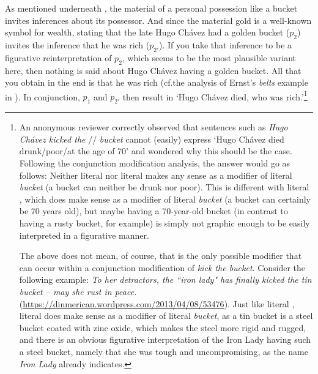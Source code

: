 \documentclass[output=paper]{langsci/langscibook}
\begin{document}
\noindent As mentioned underneath , the material of a personal possession like a bucket invites inferences about its possessor. And since the material gold is a well-known symbol for wealth, stating that the late Hugo Ch\'avez had a golden bucket ($p_{2}$) invites the inference that he was rich ($p_{2'}$). If you take that inference to be a figurative reinterpretation of $p_{2}$, which seems to be the most plausible variant here, then nothing is said about Hugo Ch\'avez having a golden bucket. All that you obtain in the end is that he was rich (cf.\@ the analysis of Ernst's \underline{} \textit{belts} example in ). In conjunction, $p_{1}$ and $p_{2'}$ then result in `Hugo Ch\'avez died, who was rich.'\footnote{An anonymous reviewer correctly observed that sentences such as \textit{Hugo Ch\'{a}vez kicked the} \underline{}/\underline{}/\underline{} \textit{bucket} cannot (easily) express `Hugo Ch\'{a}vez died drunk\slash poor\slash at the age of 70' and wondered why this should be the case. Following the conjunction modification analysis, the answer would go as follows: Neither literal \underline{} nor literal \underline{} makes any sense as a modifier of literal \textit{bucket} (a bucket can neither be drunk nor poor). This is different with literal \underline{}, which does make sense as a modifier of literal \textit{bucket} (a bucket can certainly be 70 years old), but maybe having a 70-year-old bucket (in contrast to having a rusty bucket, for example) is simply not graphic enough to be easily interpreted in a figurative manner.

The above does not mean, of course, that \underline{} is the only possible modifier that can occur within a conjunction modification of \textit{kick the bucket}. Consider the following example: \textit{To her detractors, the ``iron lady" has finally kicked the tin bucket -- may she rust in peace.} (\url{https://dinmerican.wordpress.com/2013/04/08/53476}). Just like literal \underline{}, literal \underline{} does make sense as a modifier of literal \textit{bucket}, as a tin bucket is a steel bucket coated with zinc oxide, which makes the steel more rigid and rugged, and there is an obvious figurative interpretation of the Iron Lady having such a steel bucket, namely that she was tough and uncompromising, as the name \textit{Iron Lady} already indicates.}\largerpage[-2]
\end{document}

